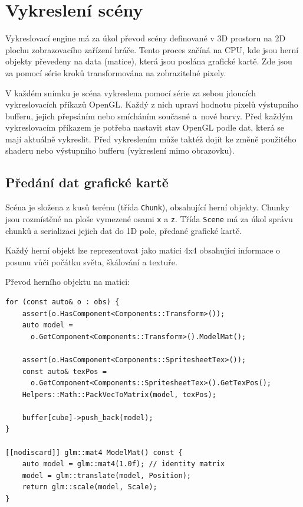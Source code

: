 \documentclass[thesis=M,czech]{FITthesis}[2019/12/23]
\begin{document}

\chapter{Vykreslení scény}

Vykreslovací engine má za úkol převod scény definované v 3D prostoru na 2D plochu zobrazovacího zařízení hráče. Tento proces začíná na CPU, kde jsou herní objekty převedeny na data (matice), která jsou poslána grafické kartě. Zde jsou za pomocí série kroků transformována na zobrazitelné pixely.

V každém snímku je scéna vykreslena pomocí série za sebou jdoucích vykreslovacích příkazů OpenGL. Každý z nich upraví hodnotu pixelů výstupního bufferu, jejich přepsáním nebo smícháním současné a~nové barvy. Před každým vykreslovacím příkazem je potřeba nastavit stav OpenGL podle dat, která se mají aktuálně vykreslit. Před vykreslením může taktéž dojít ke změně použitého shaderu nebo výstupního bufferu (vykreslení mimo obrazovku).

\section{Předání dat grafické kartě}

Scéna je složena z kusů terénu (třída \texttt{Chunk}), obsahující herní objekty. Chunky jsou rozmístěné na ploše vymezené osami \texttt{x} a \texttt{z}. Třída \texttt{Scene} má za úkol správu chunků a serializaci jejich dat do 1D pole, předané grafické kartě.

Každý herní objekt lze reprezentovat jako matici 4x4 obsahující informace o posunu vůči počátku světa, škálování a textuře.


Převod herního objektu na matici:

\begin{verbatim}
for (const auto& o : obs) {
    assert(o.HasComponent<Components::Transform>());
    auto model =
      o.GetComponent<Components::Transform>().ModelMat();

    assert(o.HasComponent<Components::SpritesheetTex>());
    const auto& texPos = 
      o.GetComponent<Components::SpritesheetTex>().GetTexPos();
    Helpers::Math::PackVecToMatrix(model, texPos);

    buffer[cube]->push_back(model);
}

[[nodiscard]] glm::mat4 ModelMat() const {
    auto model = glm::mat4(1.0f); // identity matrix
    model = glm::translate(model, Position);
    return glm::scale(model, Scale);
}
\end{verbatim}
\end{document}
